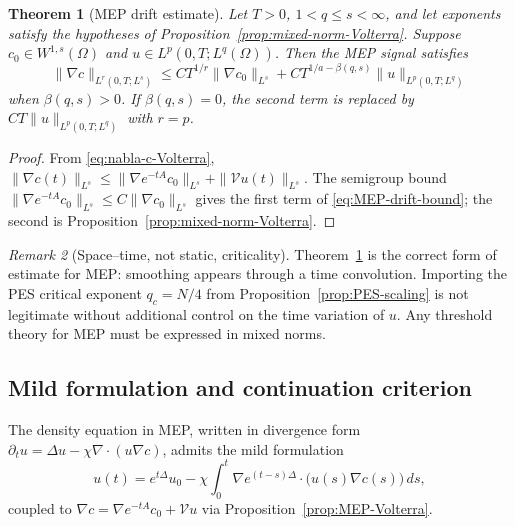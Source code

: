 \documentclass[11pt,reqno]{amsart}
\newtheorem{theorem}{Theorem}[section]
\theoremstyle{definition}
\theoremstyle{remark}
\newtheorem{remark}[theorem]{Remark}
\newcommand{\Vop}{\mathcal{V}}
\newcommand{\Div}{\nabla\!\cdot}
\begin{document}
\begin{theorem}[MEP drift estimate]\label{thm:MEP-drift}
Let $T>0$, $1<q\le s<\infty$, and let exponents satisfy the hypotheses of Proposition~\ref{prop:mixed-norm-Volterra}. Suppose $c_0\in W^{1,s}(\Omega)$ and $u\in L^{p}(0,T;L^{q}(\Omega))$. Then the MEP signal satisfies
\begin{equation}\label{eq:MEP-drift-bound}
        \|\nabla c\|_{L^{r}(0,T;L^{s})}
        \le CT^{1/r}\|\nabla c_0\|_{L^{s}}+CT^{1/a-\beta(q,s)}\|u\|_{L^{p}(0,T;L^{q})}
\end{equation}
when $\beta(q,s)>0$. If $\beta(q,s)=0$, the second term is replaced by $CT\|u\|_{L^{p}(0,T;L^{q})}$ with $r=p$.
\end{theorem}

\begin{proof}
From \eqref{eq:nabla-c-Volterra}, $\|\nabla c(t)\|_{L^{s}}\le \|\nabla e^{-tA}c_0\|_{L^{s}}+\|\Vop u(t)\|_{L^{s}}$. The semigroup bound $\|\nabla e^{-tA}c_0\|_{L^{s}}\le C\|\nabla c_0\|_{L^{s}}$ gives the first term of \eqref{eq:MEP-drift-bound}; the second is Proposition~\ref{prop:mixed-norm-Volterra}.
\end{proof}

\begin{remark}[Space--time, not static, criticality]\label{rem:spacetime-criticality}
Theorem~\ref{thm:MEP-drift} is the correct form of estimate for MEP: smoothing appears through a time convolution. Importing the PES critical exponent $q_c=N/4$ from Proposition~\ref{prop:PES-scaling} is not legitimate without additional control on the time variation of $u$. Any threshold theory for MEP must be expressed in mixed norms.
\end{remark}

\subsection{Mild formulation and continuation criterion}
\label{subsec:mild-continuation}

The density equation in MEP, written in divergence form $\partial_t u=\Delta u-\chi\Div(u\nabla c)$, admits the mild formulation
\begin{equation}\label{eq:MEP-mild-u}
        u(t)=e^{t\Delta}u_0
        -\chi\int_0^t \nabla e^{(t-s)\Delta}\cdot\bigl(u(s)\nabla c(s)\bigr)\,ds,
\end{equation}
coupled to $\nabla c=\nabla e^{-tA}c_0+\Vop u$ via Proposition~\ref{prop:MEP-Volterra}.
\end{document}
